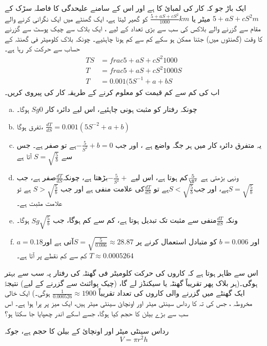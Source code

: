 ایک باڑ جو کہ کار کی لمبائ کا ہے اور اس کے سامنے علیحدگی کا فاصلہ سڑک کے  $5+aS+cS^2\si{m}$ میٹر  یا 
  $\frac{5+aS+cS^2}{1000}\si{km} $
کو گھیر لیتا ہے، ایک گھنٹے میں ایک نگرانی کرنے والے مقام سے گزرنے والے بلاکس کی سب سے بڑی تعداد کے لیے ، ایک بلاک سے چیک پوسٹ سے گزرنے کا وقت  (گھنٹوں میں) جتنا ممکن ہو سکے کم سے کم ہونا چاہئیے۔ چونکہ بلاک  کلومیٹر فی گھنٹہ کے حساب سے حرکت کر رہا ہے۔
\begin{align*}
TS&=frac{5+aS+cS^2}{1000}\\
T&=frac{5+aS+cS^2}{1000S}\\
T&=0.001(5S^{-1}+a+bS
\end{align*}
اب    کی کم سے کم  قیمت کو معلوم کرنے کے طریقہ کار کی پیروی کریں۔ 
\begin{enumerate}[a.]
\item
چونکہ رفتار کو مثبت ہونی چاہئیے، اس لیے دائرہ کار \( S g0 \) ہوگا۔
\item
تفرق ہوگا،  \( \frac{dT}{dS}= 0.001(5S^{-2}+a+b)\)
\item
یہ متفرق دائرہ کار میں ہر جگہ واضع ہے ، اور جب \( -\frac{5}{S^2}+b=0  \)ہے تو صفر ہے۔ 
جس سے  \(S=\sqrt{\frac{5}{b}}\) آتا ہے
\item
ونہی   بڑھتی ہے  \( \frac{5}{\S^2}\)کم ہوتا ہے، اس لیے  \(-\frac{5}{S^2}+ \)بڑھتا ہے، چونکہ\(\frac{dT}{dS}\)صفر ہے، جب \(S=\sqrt{\frac{5}{b}}\)ہے، اور جب\(S<\sqrt{\frac{5}{b}}\)ہے تو  \(\frac{dT}{dS}\)کی علامت منفی ہے اور جب  \(S>\sqrt{\frac{5}{b}}\) ہے تو علامت مثبت ہے۔
\item
ونکہ \(\frac{dT}{dS}\)منفی سے مثبت تک تبدیل ہوتا ہے،    کم سے کم ہوگا، جب \(   Sg\sqrt{\frac{5}{b}}  \) ہوگا۔
\item
\( a=0.18  \)اور  \( b=0.006  \)  کو متبادل استعمال کرنے پر   
\( S=\sqrt{\frac{5}{0.006}}\approx 28.87 \)آتی ہے اور     \(  T\approx 0.0005264  \)  کم سے کم نقطے پر آتا ہے۔ 
\end{enumerate}
 
اس سے ظاہر ہوتا ہے کہ کاروں کی حرکت    کلومیٹر فی گھنٹہ کی رفتار پہ سب سے بہتر ہوگی۔(ہر بلاک پھر تقریباً   گھنٹہ یا    سیکنڈز لے گا، (چیک پوائنٹ سے گزرنے کے لیے) نتیجۃً ایک گھنٹے میں گزرنے والی کاروں کی تعداد تقریباً      \( \frac{1}{0.000526} \approx 1900 \) ہوگی۔)
%
ایک خالی مخروطہ ، جس کی تہ کا رداس   سینٹی میٹر اور اونچائ  سینٹی میٹر ہیں، ایک میز پر پرا ہوا ہے۔ اس سب سے بڑے بیلن کا حجم کیا ہوگا، جسے اسکے اندر چھپایا جا سکتا ہو؟

رداس   سینٹی میٹر اور اونچائ   کے بیلن کا حجم    ہے، جوکہ   \[V=\pi r^2h\]

